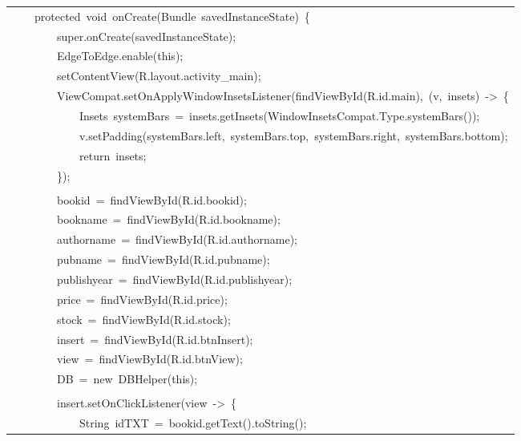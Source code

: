 \documentclass[a4paper,12pt]{article}
\begin{document}
\begin{longtable}{|p{}|}
{\ttfamily\small \ \ \ \ protected\ void\ onCreate(Bundle\ savedInstanceState)\ \{} \\
{\ttfamily\small \ \ \ \ \ \ \ \ super.onCreate(savedInstanceState);} \\
{\ttfamily\small \ \ \ \ \ \ \ \ EdgeToEdge.enable(this);} \\
{\ttfamily\small \ \ \ \ \ \ \ \ setContentView(R.layout.activity\_main);} \\
{\ttfamily\small \ \ \ \ \ \ \ \ ViewCompat.setOnApplyWindowInsetsListener(findViewById(R.id.main),\ (v,\ insets)\ -\textgreater{}\ \{} \\
{\ttfamily\small \ \ \ \ \ \ \ \ \ \ \ \ Insets\ systemBars\ =\ insets.getInsets(WindowInsetsCompat.Type.systemBars());} \\
{\ttfamily\small \ \ \ \ \ \ \ \ \ \ \ \ v.setPadding(systemBars.left,\ systemBars.top,\ systemBars.right,\ systemBars.bottom);} \\
{\ttfamily\small \ \ \ \ \ \ \ \ \ \ \ \ return\ insets;} \\
{\ttfamily\small \ \ \ \ \ \ \ \ \});} \\
\strut \\
{\ttfamily\small \ \ \ \ \ \ \ \ bookid\ =\ findViewById(R.id.bookid);} \\
{\ttfamily\small \ \ \ \ \ \ \ \ bookname\ =\ findViewById(R.id.bookname);} \\
{\ttfamily\small \ \ \ \ \ \ \ \ authorname\ =\ findViewById(R.id.authorname);} \\
{\ttfamily\small \ \ \ \ \ \ \ \ pubname\ =\ findViewById(R.id.pubname);} \\
{\ttfamily\small \ \ \ \ \ \ \ \ publishyear\ =\ findViewById(R.id.publishyear);} \\
{\ttfamily\small \ \ \ \ \ \ \ \ price\ =\ findViewById(R.id.price);} \\
{\ttfamily\small \ \ \ \ \ \ \ \ stock\ =\ findViewById(R.id.stock);} \\
{\ttfamily\small \ \ \ \ \ \ \ \ insert\ =\ findViewById(R.id.btnInsert);} \\
{\ttfamily\small \ \ \ \ \ \ \ \ view\ =\ findViewById(R.id.btnView);} \\
{\ttfamily\small \ \ \ \ \ \ \ \ DB\ =\ new\ DBHelper(this);} \\
\strut \\
{\ttfamily\small \ \ \ \ \ \ \ \ insert.setOnClickListener(view\ -\textgreater{}\ \{} \\
{\ttfamily\small \ \ \ \ \ \ \ \ \ \ \ \ String\ idTXT\ =\ bookid.getText().toString();} \\

\end{longtable}
\end{document}
